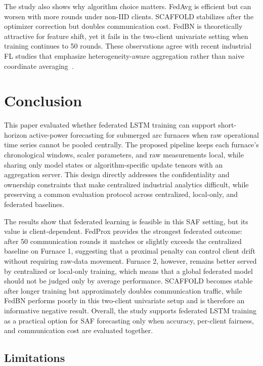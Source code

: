 \documentclass[pdflatex,sn-mathphys-num]{sn-jnl}
\theoremstyle{thmstyleone}%
\theoremstyle{thmstyletwo}%
\theoremstyle{thmstylethree}%
\begin{document}
The study also shows why algorithm choice matters. FedAvg is efficient but can worsen with more rounds under non-IID clients. SCAFFOLD stabilizes after the optimizer correction but doubles communication cost. FedBN is theoretically attractive for feature shift, yet it fails in the two-client univariate setting when training continues to 50 rounds. These observations agree with recent industrial FL studies that emphasize heterogeneity-aware aggregation rather than naive coordinate averaging~\cite{arunan2024matched}.

\section{Conclusion}\label{sec:conclusion}

This paper evaluated whether federated LSTM training can support short-horizon active-power forecasting for submerged arc furnaces when raw operational time series cannot be pooled centrally. The proposed pipeline keeps each furnace's chronological windows, scaler parameters, and raw measurements local, while sharing only model states or algorithm-specific update tensors with an aggregation server. This design directly addresses the confidentiality and ownership constraints that make centralized industrial analytics difficult, while preserving a common evaluation protocol across centralized, local-only, and federated baselines.

The results show that federated learning is feasible in this SAF setting, but its value is client-dependent. FedProx provides the strongest federated outcome: after 50 communication rounds it matches or slightly exceeds the centralized baseline on Furnace 1, suggesting that a proximal penalty can control client drift without requiring raw-data movement. Furnace 2, however, remains better served by centralized or local-only training, which means that a global federated model should not be judged only by average performance. SCAFFOLD becomes stable after longer training but approximately doubles communication traffic, while FedBN performs poorly in this two-client univariate setup and is therefore an informative negative result. Overall, the study supports federated LSTM training as a practical option for SAF forecasting only when accuracy, per-client fairness, and communication cost are evaluated together.

\subsection{Limitations}\label{sec:limitations}
\end{document}
